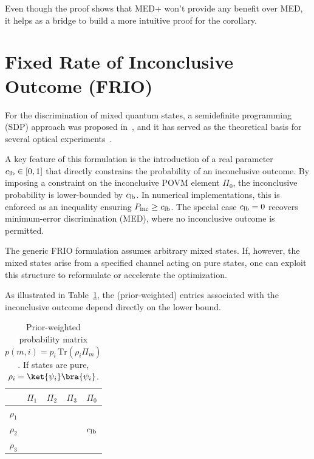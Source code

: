Even though the proof shows that MED+ won't provide any benefit over
MED, it helps as a bridge to build a more intuitive proof for the corollary.


\section{Fixed Rate of Inconclusive Outcome (FRIO)}
\label{sec:frio}
For the discrimination of mixed quantum states, a semidefinite programming (SDP)
approach was proposed in~\cite{RN37}, and it has served as the theoretical basis
for several optical experiments~\cite{RN48,RN221,RN29}.

A key feature of this formulation is the introduction of a real parameter
\(c_{\mathrm{lb}} \in [0,1]\) that directly constrains the probability of an inconclusive
outcome. By imposing a constraint on the inconclusive POVM element \(\Pi_{0}\),
the inconclusive probability is lower-bounded by \(c_{\mathrm{lb}}\). In numerical
implementations, this is enforced as an inequality ensuring
\(P_{\mathrm{inc}} \ge c_{\mathrm{lb}}\). The special case \(c_{\mathrm{lb}}=0\) recovers
minimum-error discrimination (MED), where no inconclusive outcome is permitted.

The generic FRIO formulation assumes arbitrary mixed states. If, however, the
mixed states arise from a specified channel acting on pure states, one can
exploit this structure to reformulate or accelerate the optimization.

As illustrated in Table~\ref{tab:frio_prob_mat}, the (prior-weighted) entries
associated with the inconclusive outcome depend directly on the lower bound.

\begin{table}[ht]
    \centering
    \begin{tabular}{c | c c c c}
                     & \(\Pi_{1}\)          & \(\Pi_{2}\)          & \(\Pi_{3}\)          & \(\Pi_{0}\)                    \\
        \hline
        \(\rho_{1}\) & \cellcolor{green!20} & \cellcolor{red!20}   & \cellcolor{red!20}   & \cellcolor{yellow!30}          \\
        \(\rho_{2}\) & \cellcolor{red!20}   & \cellcolor{green!20} & \cellcolor{red!20}   & \cellcolor{yellow!30} \(c_{\mathrm{lb}}\) \\
        \(\rho_{3}\) & \cellcolor{red!20}   & \cellcolor{red!20}   & \cellcolor{green!20} & \cellcolor{yellow!30}          \\
    \end{tabular}
    \caption{Prior-weighted probability matrix \(p(m,i)=p_i\,\mathrm{Tr}(\rho_i \Pi_m)\).
        If states are pure, \(\rho_i=\ket{\psi_i}\bra{\psi_i}\).}
    \label{tab:frio_prob_mat}
\end{table}

